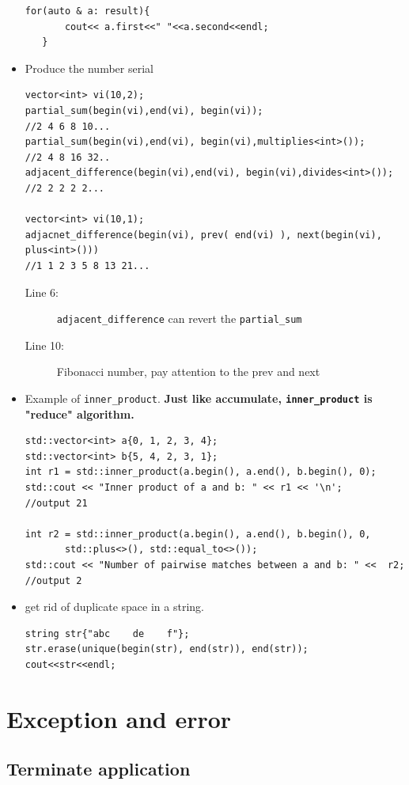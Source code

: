 \documentclass[a4paper,11pt,twoside]{book}
\begin{document}
\begin{itemize}
\begin{lstlisting}
for(auto & a: result){
       cout<< a.first<<" "<<a.second<<endl;
   }
\end{lstlisting}

\item Produce the number serial
\begin{lstlisting}
vector<int> vi(10,2);
partial_sum(begin(vi),end(vi), begin(vi));
//2 4 6 8 10...
partial_sum(begin(vi),end(vi), begin(vi),multiplies<int>());
//2 4 8 16 32..
adjacent_difference(begin(vi),end(vi), begin(vi),divides<int>());
//2 2 2 2 2...

vector<int> vi(10,1);
adjacnet_difference(begin(vi), prev( end(vi) ), next(begin(vi), plus<int>()))
//1 1 2 3 5 8 13 21...
\end{lstlisting}
\begin{description}
\item[Line 6:] \texttt{adjacent\_difference} can revert the \texttt{partial\_sum}
\item[Line 10:] Fibonacci number, pay attention to the prev and next
\end{description}

\item  Example of \texttt{inner\_product}. \textbf{Just like accumulate, \texttt{inner\_product} is "reduce" algorithm.}

\begin{lstlisting}
std::vector<int> a{0, 1, 2, 3, 4};
std::vector<int> b{5, 4, 2, 3, 1};
int r1 = std::inner_product(a.begin(), a.end(), b.begin(), 0);
std::cout << "Inner product of a and b: " << r1 << '\n';
//output 21

int r2 = std::inner_product(a.begin(), a.end(), b.begin(), 0,
       std::plus<>(), std::equal_to<>());
std::cout << "Number of pairwise matches between a and b: " <<  r2;
//output 2
\end{lstlisting}

\item get rid of duplicate space in a string.
\begin{lstlisting}
string str{"abc    de    f"};
str.erase(unique(begin(str), end(str)), end(str));
cout<<str<<endl;
\end{lstlisting}

\end{itemize}


\chapter{Exception and error}
\section{Terminate application}
\end{document}

